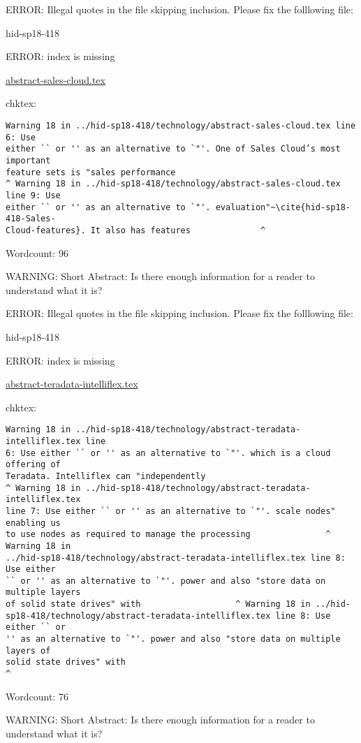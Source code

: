 ERROR: Illegal quotes in the file skipping inclusion. Please fix the folllowing file:

\begin{IU}

hid-sp18-418

ERROR: index is missing

\href{https://github.com/cloudmesh-community/hid-sp18-418/blob/master//technology/abstract-sales-cloud.tex}{abstract-sales-cloud.tex}

 
chktex:
\begin{tiny}
\begin{verbatim}
Warning 18 in ../hid-sp18-418/technology/abstract-sales-cloud.tex line 6: Use
either `` or '' as an alternative to `"'. One of Sales Cloud’s most important
feature sets is "sales performance
^ Warning 18 in ../hid-sp18-418/technology/abstract-sales-cloud.tex line 9: Use
either `` or '' as an alternative to `"'. evaluation"~\cite{hid-sp18-418-Sales-
Cloud-features}. It also has features              ^
\end{verbatim}
\end{tiny}

Wordcount: 96

WARNING: Short Abstract: Is there enough information for a reader to understand what it is?

\end{IU}

ERROR: Illegal quotes in the file skipping inclusion. Please fix the folllowing file:

\begin{IU}

hid-sp18-418

ERROR: index is missing

\href{https://github.com/cloudmesh-community/hid-sp18-418/blob/master//technology/abstract-teradata-intelliflex.tex}{abstract-teradata-intelliflex.tex}

 
chktex:
\begin{tiny}
\begin{verbatim}
Warning 18 in ../hid-sp18-418/technology/abstract-teradata-intelliflex.tex line
6: Use either `` or '' as an alternative to `"'. which is a cloud offering of
Teradata. Intelliflex can "independently
^ Warning 18 in ../hid-sp18-418/technology/abstract-teradata-intelliflex.tex
line 7: Use either `` or '' as an alternative to `"'. scale nodes" enabling us
to use nodes as required to manage the processing               ^ Warning 18 in
../hid-sp18-418/technology/abstract-teradata-intelliflex.tex line 8: Use either
`` or '' as an alternative to `"'. power and also "store data on multiple layers
of solid state drives" with                   ^ Warning 18 in ../hid-
sp18-418/technology/abstract-teradata-intelliflex.tex line 8: Use either `` or
'' as an alternative to `"'. power and also "store data on multiple layers of
solid state drives" with
^
\end{verbatim}
\end{tiny}

Wordcount: 76

WARNING: Short Abstract: Is there enough information for a reader to understand what it is?

\end{IU}

